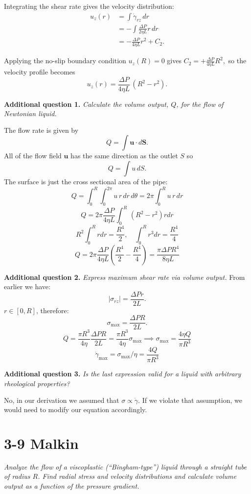 \documentclass[12pt, a4paper]{article}
\numberwithin{equation}{section}
\begin{document}
Integrating the shear rate gives the velocity distribution:
\begin{align*}
	u_z(r)
	&=
	\int \dot\gamma_{rz}\,dr \\
	&=
	-\int \frac{\Delta P}{2\eta L} r\,dr \\
	&=
	-\frac{\Delta P}{4\eta L} r^2 + C_2.
\end{align*}

Applying the no-slip boundary condition $u_z(R) = 0$ gives
$C_2 = +\frac{\Delta P}{4\eta L} R^2,$
so the velocity profile becomes
\[
	\boxed{
	u_z(r) =
	\frac{\Delta P}{4\eta L}\,(R^2 - r^2)
	}.
\]

\textbf{Additional question 1.} \textit{Calculate the volume output, $Q$, for the flow of Newtonian liquid.}

The flow rate is given by
\[
	Q = \int \mathbf{u} \cdot d\mathbf{S}.
\]
All of the flow field $\mathbf{u}$ has the same direction as the outlet $S$ so
\[
	Q = \int u\, dS.
\]
The surface is just the cross sectional area of the pipe:
\[
	Q = \int_0^R \int_0^{2\pi} u\, r\, dr\, d\theta
	  = 2\pi\int_0^R  u\, r\, dr
\]
\[
	Q = 2\pi  \frac{\Delta P}{4\eta L}\int_0^R\,(R^2 - r^2) r dr
\]
\[
	R^2 \int_0^R r dr = \frac{R^4}{2}, \quad
	\int_0^R r^3 dr = \frac{R^4}{4}
\]
\[
	Q = 2\pi  \frac{\Delta P}{4\eta L}
	\left(\frac{R^4}{2} - \frac{R^4}{4}\right)
	= \boxed{\frac{\pi \Delta P R^4}{8\eta L}}
\]

\textbf{Additional question 2.} \textit{Express maximum shear rate via volume output.}
From earlier we have:
\[
	|\sigma_{rz}| = \frac{\Delta P r}{2 L}.
\]
$r\in[0,R]$, therefore:
\[
	\sigma_\text{max} = \frac{\Delta P R}{2 L}.
\]
\[
	Q = \frac{\pi R^3}{4\eta} \frac{\Delta P R}{2 L} = \frac{\pi R^3}{4\eta} \sigma_\text{max}
	\implies \sigma_\text{max} =  \frac{4\eta Q}{\pi R^3}
\]
\[
	\dot\gamma_\text{max} = \sigma_\text{max}/\eta = \boxed{\frac{4Q}{\pi R^3}}
\]


\textbf{Additional question 3.} \textit{Is the last expression valid for a liquid with arbitrary rheological properties?}

No, in our derivation we assumed that $\sigma \propto \dot\gamma$. If we violate that assumption, we would need to modify our equation accordingly.

\section{3-9 Malkin}
\textit{Analyze the flow of a viscoplastic (``Bingham-type'') liquid through a straight tube of radius $R$. Find radial stress and velocity distributions and calculate volume output as a function of the pressure gradient.}
\end{document}
